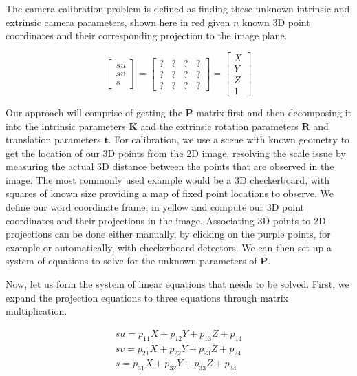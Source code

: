 The camera calibration problem is defined as finding these unknown intrinsic and
extrinsic camera parameters, shown here in red given $n$ known 3D point coordinates and
their corresponding projection to the image plane. 

\begin{equation}
\begin{bmatrix}
su \\
sv \\
s
\end{bmatrix} =
\begin{bmatrix}
? & ? & ? & ? \\
? & ? & ? & ? \\
? & ? & ? & ?
\end{bmatrix}=
\begin{bmatrix}
X \\
Y \\
Z  \\
1
\end{bmatrix}
\end{equation}

Our approach will comprise of getting the $\mathbf{P}$ matrix first and
then decomposing it into the intrinsic parameters $\mathbf{K}$ and 
the extrinsic rotation parameters $\mathbf{R}$ and translation parameters $\mathbf{t}$. For calibration, we use a scene with
known geometry to get the location of our 3D points from the 2D image, resolving the scale
issue by measuring the actual 3D distance between the points that
are observed in the image. The most commonly used example would be a 3D checkerboard, with squares of
known size providing a map of fixed point locations to observe. We define our word
coordinate frame, in yellow and compute our 3D point coordinates and
their projections in the image. Associating 3D points to 2D projections can be
done either manually, by clicking on the purple points, for example or automatically, with checkerboard detectors. We can then set up
a system of equations to solve for the unknown parameters of $\mathbf{P}$. 

Now, let us form the system of linear equations that
needs to be solved. First, we expand
the projection equations to three equations through
matrix multiplication. 

\begin{eqnarray}
su = p_{11} X + p_{12} Y + p_{13} Z + p_{14} \\
sv = p_{21} X + p_{22} Y + p_{23} Z + p_{24} \\
s = p_{31} X + p_{32} Y + p_{33} Z + p_{34}
\end{eqnarray}

